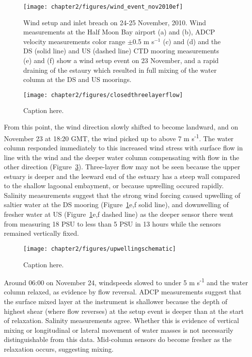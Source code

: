 \begin{figure}[t]
	\centering
	\texttt{[image: chapter2/figures/wind\_event\_nov2010ef]}
\caption{Wind setup and inlet breach on 24-25 November, 2010. Wind measurements at the Half Moon Bay airport (a) and (b), ADCP velocity measurements color range $\pm $0.5 m s$^{-1}$ (c) and (d) and the DS (solid line) and US (dashed line) CTD mooring measurements (e) and (f) show a wind setup event on 23 November, and a rapid draining of the estaury which resulted in full mixing of the water column at the DS and US moorings.}
\label{fig:closed_UVwindsalt}
\end{figure}


\begin{figure}
	\centering
	\texttt{[image: chapter2/figures/closedthreelayerflow]}
\caption{Caption here.} \label{fig:schematic3lf}
\end{figure}


From this point, the wind direction slowly shifted to become landward, and on November 23 at 18:20 GMT, the wind picked up to above 7 m s\textsuperscript{-1}. The water column responded immediately to this increased wind stress with surface flow in line with the wind and the  deeper water column compensating with flow in the other direction (Figure~\ref{fig:schematicupwelling}). Three-layer flow may not be seen because the upper estuary is deeper and the leeward end of the estuary has a steep wall compared to the shallow lagoonal embayment, or because upwelling occured rapidly. Salinity measurements suggest that the strong wind forcing caused upwelling of saltier water at the DS mooring (Figure~\ref{fig:closed_UVwindsalt}e,f solid line), and downwelling of fresher water at US (Figure~\ref{fig:closed_UVwindsalt}e,f dashed line) as the deeper sensor there went from measuring 18 PSU to less than 5 PSU in 13 hours while the sensors remained vertically fixed.


\begin{figure}
\centering
	\texttt{[image: chapter2/figures/upwellingschematic]}
\caption{Caption here.} \label{fig:schematicupwelling}
\end{figure}

Around 06:00 on November 24, windspeeds slowed to under 5 m s\textsuperscript{-1} and the water column relaxed, as evidence by flow reversal. ADCP measurements suggest that the surface mixed layer at the instrument is shallower because the depth of highest shear (where flow reverses) at the setup event is deeper than at the start of relaxation. Salinity measurements agree. Whether this is evidence of vertical mixing or longitudinal or lateral movement of water masses is not necessarily distinguishable from this data. Mid-column sensors do become fresher as the relaxation occurs, suggesting mixing. 

